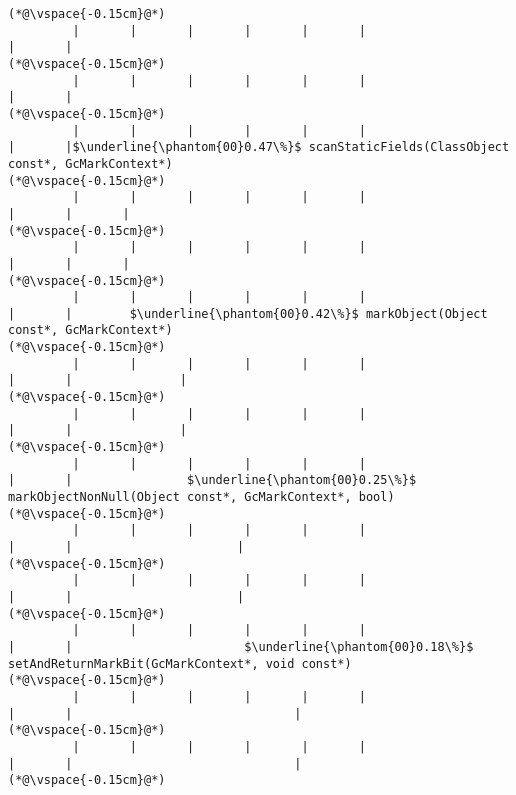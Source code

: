 \begin{lstlisting}[caption=NewDirectByteBuffer, label=profile:C2JNewDirectBuffer-512, numberbychapter=true, frame=lines, float, floatplacement=t]
(*@\vspace{-0.15cm}@*)
         |       |       |       |       |       |                       |       |
(*@\vspace{-0.15cm}@*)
         |       |       |       |       |       |                       |       |
(*@\vspace{-0.15cm}@*)
         |       |       |       |       |       |                       |       |$\underline{\phantom{00}0.47\%}$ scanStaticFields(ClassObject const*, GcMarkContext*)
(*@\vspace{-0.15cm}@*)
         |       |       |       |       |       |                       |       |       |
(*@\vspace{-0.15cm}@*)
         |       |       |       |       |       |                       |       |       |
(*@\vspace{-0.15cm}@*)
         |       |       |       |       |       |                       |       |        $\underline{\phantom{00}0.42\%}$ markObject(Object const*, GcMarkContext*)
(*@\vspace{-0.15cm}@*)
         |       |       |       |       |       |                       |       |               |
(*@\vspace{-0.15cm}@*)
         |       |       |       |       |       |                       |       |               |
(*@\vspace{-0.15cm}@*)
         |       |       |       |       |       |                       |       |                $\underline{\phantom{00}0.25\%}$ markObjectNonNull(Object const*, GcMarkContext*, bool)
(*@\vspace{-0.15cm}@*)
         |       |       |       |       |       |                       |       |                       |
(*@\vspace{-0.15cm}@*)
         |       |       |       |       |       |                       |       |                       |
(*@\vspace{-0.15cm}@*)
         |       |       |       |       |       |                       |       |                        $\underline{\phantom{00}0.18\%}$ setAndReturnMarkBit(GcMarkContext*, void const*)
(*@\vspace{-0.15cm}@*)
         |       |       |       |       |       |                       |       |                               |
(*@\vspace{-0.15cm}@*)
         |       |       |       |       |       |                       |       |                               |
(*@\vspace{-0.15cm}@*)

\end{lstlisting}
